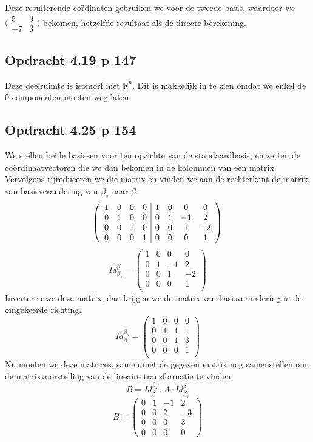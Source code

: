 \documentclass[lineaire_algebra_oplossingen.tex]{subfiles}
\begin{document}
Deze resulterende co\"rdinaten gebruiken we voor de tweede basis, waardoor we $\bigl(
\begin{smallmatrix}
5&9\\ -7&3
\end{smallmatrix}\bigr)$ bekomen, hetzelfde resultaat als de directe berekening.


\subsection{Opdracht 4.19 p 147}
\label{4.19}
Deze deelruimte is isomorf met $\mathbb{R}^n$. Dit is makkelijk in te zien omdat we enkel de $0$ componenten moeten weg laten. 


\subsection{Opdracht 4.25 p 154}
\label{4.25}
We stellen beide basissen voor ten opzichte van de standaardbasis, en zetten de co\"ordinaatvectoren die we dan bekomen in de kolommen van een matrix.
Vervolgens rijreduceren we die matrix en vinden we aan de rechterkant de matrix van basisverandering van $\beta_s$ naar $\beta$.
\[
\left(
\begin{array}{c c c c | c c c c}
1 & 0 & 0 & 0 & 1 & 0 & 0 & 0\\
0 & 1 & 0 & 0 & 0 & 1 & -1 & 2\\
0 & 0 & 1 & 0 & 0 & 0 & 1 & -2\\
0 & 0 & 0 & 1 & 0 & 0 & 0 & 1\\
\end{array}
\right)
\]
\[
Id_{\beta_s}^\beta = 
\begin{pmatrix}
1 & 0 & 0 & 0\\
0 & 1 & -1 & 2\\
0 & 0 & 1 & -2\\
0 & 0 & 0 & 1\\
\end{pmatrix}
\]
Inverteren we deze matrix, dan krijgen we de matrix van basisverandering in de omgekeerde richting.
\[
Id_{\beta}^{\beta_s} = 
\begin{pmatrix}
1 & 0 & 0 & 0\\
0 & 1 & 1 & 1\\
0 & 0 & 1 & 3\\
0 & 0 & 0 & 1\\
\end{pmatrix}
\]
Nu moeten we deze matrices, samen met de gegeven matrix nog samenstellen om de matrixvoorstelling van de lineaire transformatie te vinden.
\[
B = Id_{\beta}^{\beta_s}\cdot  A\cdot Id_{\beta_s}^\beta
\]
\[
B = 
\begin{pmatrix}
0 & 1 & -1 &2\\
0 & 0 & 2 &-3\\
0 & 0 & 0 & 3\\
0 & 0 & 0 & 0
\end{pmatrix}
\]
\end{document}
